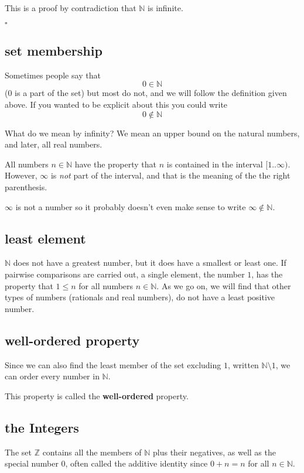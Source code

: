 \documentclass[11pt, oneside]{article}
\begin{document}
This is a proof by contradiction that $\mathbb{N}$ is infinite.

$\square$

\subsection*{set membership}

Sometimes people say that
\[ 0 \in \mathbb{N} \]
(0 is a part of the set) but most do not, and we will follow the definition given above.  If you wanted to be explicit about this you could write
\[ 0 \notin \mathbb{N} \]

What do we mean by infinity?  We mean an upper bound on the natural numbers, and later, all real numbers.  

All numbers $n \in \mathbb{N}$ have the property that $n$ is contained in the interval $[1..\infty)$.  However, $\infty$ is \emph{not} part of the interval, and that is the meaning of the the right parenthesis.

$\infty$ is not a number so it probably doesn't even make sense to write $\infty \notin \mathbb{N}$.

\subsection*{least element}

$\mathbb{N}$ does not have a greatest number, but it does have a smallest or least one.  If pairwise comparisons are carried out, a single element, the number $1$, has the property that $1 \le n$ for all numbers $n \in \mathbb{N}$.  As we go on, we will find that other types of numbers (rationals and real numbers), do not have a least positive number.

\subsection*{well-ordered property}

Since we can also find the least member of the set excluding $1$, written $\mathbb{N} \setminus 1$, we can order every number in $\mathbb{N}$.  

This property is called the \textbf{well-ordered} property.

\subsection*{the Integers}

The set $\mathbb{Z}$ contains all the members of $\mathbb{N}$ plus their negatives, as well as the special number $0$, often called the additive identity since $0 + n = n$ for all $n \in \mathbb{N}$.
\end{document}
